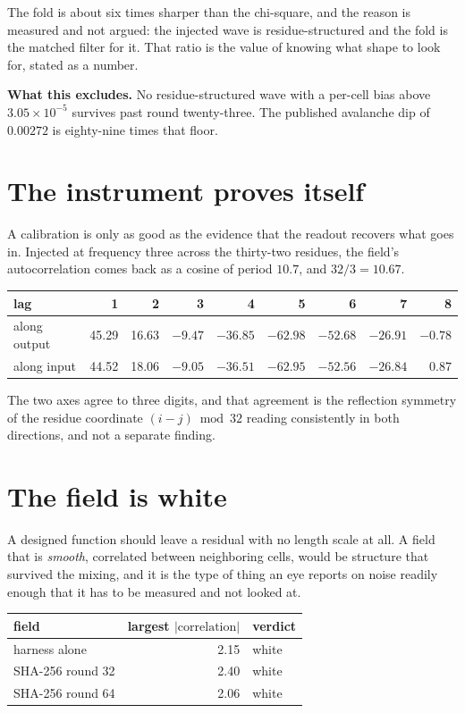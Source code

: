 The fold is about six times sharper than the chi-square, and the reason is measured and not argued:
the injected wave is residue-structured and the fold is the matched filter for it. That ratio is
the value of knowing what shape to look for, stated as a number.

\textbf{What this excludes.} No residue-structured wave with a per-cell bias above
\(3.05 \times 10^{-5}\) survives past round twenty-three. The published avalanche dip of
\(0.00272\) is eighty-nine times that floor.

\section{The instrument proves itself}

A calibration is only as good as the evidence that the readout recovers what goes in. Injected at
frequency three across the thirty-two residues, the field's autocorrelation comes back as a cosine
of period \(10.7\), and \(32/3 = 10.67\).

\begin{center}
\begin{tabular}{lrrrrrrrr}
\toprule
lag & 1 & 2 & 3 & 4 & 5 & 6 & 7 & 8 \\
\midrule
along output & 45.29 & 16.63 & \(-9.47\) & \(-36.85\) & \(-62.98\) & \(-52.68\) & \(-26.91\) & \(-0.78\) \\
along input & 44.52 & 18.06 & \(-9.05\) & \(-36.51\) & \(-62.95\) & \(-52.56\) & \(-26.84\) & \(0.87\) \\
\bottomrule
\end{tabular}
\end{center}

The two axes agree to three digits, and that agreement is the reflection symmetry of the residue coordinate
\((i - j) \bmod 32\) reading consistently in both directions, and not a separate finding.

\section{The field is white}

A designed function should leave a residual with no length scale at all. A field that is
\emph{smooth}, correlated between neighboring cells, would be structure that survived the
mixing, and it is the type of thing an eye reports on noise readily enough that it has to be
measured and not looked at.

\begin{center}
\begin{tabular}{lrl}
\toprule
field & largest \(|\text{correlation}|\) & verdict \\
\midrule
harness alone & 2.15 & white \\
SHA-256 round 32 & 2.40 & white \\
SHA-256 round 64 & 2.06 & white \\
\bottomrule
\end{tabular}
\end{center}

